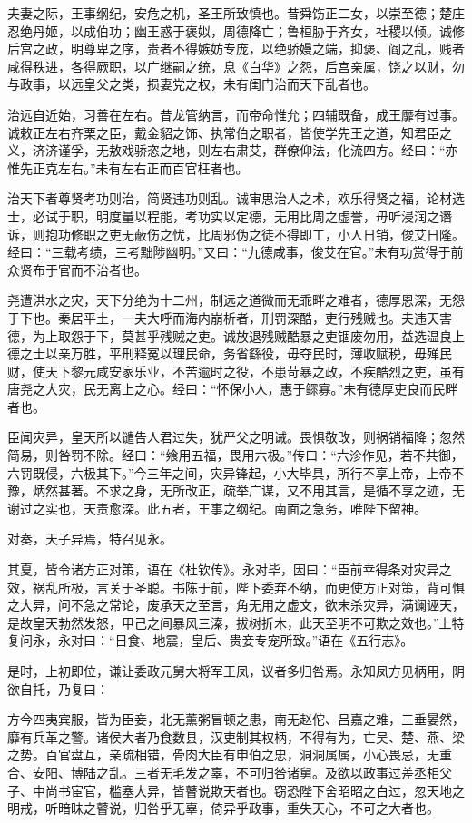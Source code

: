 \documentclass[]{article}
\begin{document}
夫妻之际，王事纲纪，安危之机，圣王所致慎也。昔舜饬正二女，以崇至德；楚庄忍绝丹姬，以成伯功；幽王惑于褒姒，周德降亡；鲁桓胁于齐女，社稷以倾。诚修后宫之政，明尊卑之序，贵者不得嫉妨专庞，以绝骄嫚之端，抑褒、阎之乱，贱者咸得秩进，各得厥职，以广继嗣之统，息《白华》之怨，后宫亲属，饶之以财，勿与政事，以远皇父之类，损妻党之权，未有闺门治而天下乱者也。

治远自近始，习善在左右。昔龙管纳言，而帝命惟允；四辅既备，成王靡有过事。诚敕正左右齐栗之臣，戴金貂之饰、执常伯之职者，皆使学先王之道，知君臣之义，济济谨孚，无敖戏骄恣之地，则左右肃艾，群僚仰法，化流四方。经曰：``亦惟先正克左右。''未有左右正而百官枉者也。

治天下者尊贤考功则治，简贤违功则乱。诚审思治人之术，欢乐得贤之福，论材选士，必试于职，明度量以程能，考功实以定德，无用比周之虚誉，毋听浸润之谮诉，则抱功修职之吏无蔽伤之忧，比周邪伪之徒不得即工，小人日销，俊艾日隆。经曰：``三载考绩，三考黜陟幽明。''又曰：``九德咸事，俊艾在官。''未有功赏得于前众贤布于官而不治者也。

尧遭洪水之灾，天下分绝为十二州，制远之道微而无乖畔之难者，德厚恩深，无怨于下也。秦居平土，一夫大呼而海内崩析者，刑罚深酷，吏行残贼也。夫违天害德，为上取怨于下，莫甚乎残贼之吏。诚放退残贼酷暴之吏锢废勿用，益选温良上德之士以亲万胜，平刑释冤以理民命，务省繇役，毋夺民时，薄收赋税，毋殚民财，使天下黎元咸安家乐业，不苦逾时之役，不患苛暴之政，不疾酷烈之吏，虽有唐尧之大灾，民无离上之心。经曰：``怀保小人，惠于鳏寡。''未有德厚吏良而民畔者也。

臣闻灾异，皇天所以谴告人君过失，犹严父之明诫。畏惧敬改，则祸销福降；忽然简易，则咎罚不除。经曰：``飨用五福，畏用六极。''传曰：``六沴作见，若不共御，六罚既侵，六极其下。''今三年之间，灾异锋起，小大毕具，所行不享上帝，上帝不豫，炳然甚著。不求之身，无所改正，疏举广谋，又不用其言，是循不享之迹，无谢过之实也，天责愈深。此五者，王事之纲纪。南面之急务，唯陛下留神。

对奏，天子异焉，特召见永。

其夏，皆令诸方正对策，语在《杜钦传》。永对毕，因曰：``臣前幸得条对灾异之效，祸乱所极，言关于圣聪。书陈于前，陛下委弃不纳，而更使方正对策，背可惧之大异，问不急之常论，废承天之至言，角无用之虚文，欲末杀灾异，满谰诬天，是故皇天勃然发怒，甲己之间暴风三溱，拔树折木，此天至明不可欺之效也。''上特复问永，永对曰：``日食、地震，皇后、贵妾专宠所致。''语在《五行志》。

是时，上初即位，谦让委政元舅大将军王凤，议者多归咎焉。永知凤方见柄用，阴欲自托，乃复曰：

方今四夷宾服，皆为臣妾，北无薰粥冒顿之患，南无赵佗、吕嘉之难，三垂晏然，靡有兵革之警。诸侯大者乃食数县，汉吏制其权柄，不得有为，亡吴、楚、燕、梁之势。百官盘互，亲疏相错，骨肉大臣有申伯之忠，洞洞属属，小心畏忌，无重合、安阳、博陆之乱。三者无毛发之辜，不可归咎诸舅。及欲以政事过差丞相父子、中尚书宦官，槛塞大异，皆瞽说欺天者也。窃恐陛下舍昭昭之白过，忽天地之明戒，听暗昧之瞽说，归咎乎无辜，倚异乎政事，重失天心，不可之大者也。
\end{document}

